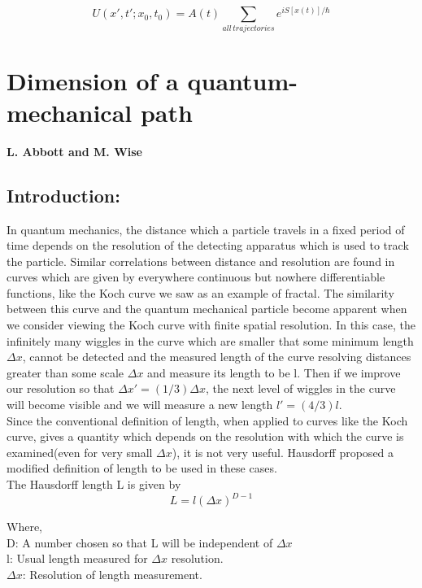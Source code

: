 \documentclass[14pt]{extarticle}
\begin{document}
$$U(x',t';x_0,t_0) = A(t) \sum_{all \, trajectories} e^{iS[x(t)]/\hbar}$$

\newpage

\section{Dimension of a quantum-mechanical path}
 \textbf{L. Abbott and M. Wise}
 
 \subsection{Introduction:}
 
 In quantum mechanics, the distance which a particle travels in a fixed period of time depends on the resolution of the detecting apparatus which is used to track the particle. Similar correlations between distance and resolution are found in curves which are given by everywhere continuous but nowhere differentiable functions, like the Koch curve we saw as an example of fractal. The similarity between this curve and the quantum mechanical particle become apparent when we consider viewing the Koch curve with finite spatial resolution. In this case, the infinitely many wiggles in the curve which are smaller that some minimum length $\Delta x$, cannot be detected and the measured length of the curve resolving distances greater than some scale $\Delta x$ and measure its length to be l. Then if we improve our resolution so that $\Delta x'=(1/3) \Delta x$, the next level of wiggles in the curve will become visible and we will measure a new length $l'=(4/3)l$.\\
 Since the conventional definition of length, when applied to curves like the Koch curve, gives a quantity which depends on the resolution with which the curve is examined(even for very small 
$ \Delta x$), it is not very useful. Hausdorff proposed a modified definition of length to be used in these cases.\\

The Hausdorff length L is given by 
$$L=l(\Delta x)^{D-1}$$

Where, \\
D:\hspace{7mm}  A number chosen so that L will be independent of $\Delta x$\\
 l:\hspace{10mm} Usual length measured for $\Delta x$ resolution.\\
$\Delta x$:\hspace{5mm} Resolution of length measurement.\\
\end{document}
